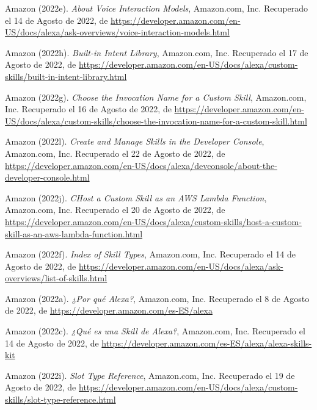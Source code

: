 
\begin{thebibliography}{9}
Amazon (2022e). \emph{About Voice Interaction Models}, Amazon.com, Inc. Recuperado el 14 de Agosto de 2022, de \url{https://developer.amazon.com/en-US/docs/alexa/ask-overviews/voice-interaction-models.html}

Amazon (2022h). \emph{Built-in Intent Library}, Amazon.com, Inc. Recuperado el 17 de Agosto de 2022, de \url{https://developer.amazon.com/en-US/docs/alexa/custom-skills/built-in-intent-library.html}

Amazon (2022g). \emph{Choose the Invocation Name for a Custom Skill}, Amazon.com, Inc. Recuperado el 16 de Agosto de 2022, de \url{https://developer.amazon.com/en-US/docs/alexa/custom-skills/choose-the-invocation-name-for-a-custom-skill.html}

Amazon (2022l). \emph{Create and Manage Skills in the Developer Console}, Amazon.com, Inc. Recuperado el 22 de Agosto de 2022, de \url{https://developer.amazon.com/en-US/docs/alexa/devconsole/about-the-developer-console.html}

Amazon (2022j). \emph{CHost a Custom Skill as an AWS Lambda Function}, Amazon.com, Inc. Recuperado el 20 de Agosto de 2022, de \url{https://developer.amazon.com/en-US/docs/alexa/custom-skills/host-a-custom-skill-as-an-aws-lambda-function.html}

Amazon (2022f). \emph{Index of Skill Types}, Amazon.com, Inc. Recuperado el 14 de Agosto de 2022, de \url{https://developer.amazon.com/en-US/docs/alexa/ask-overviews/list-of-skills.html}

Amazon (2022a). \emph{¿Por qué Alexa?}, Amazon.com, Inc. Recuperado el 8 de Agosto de 2022, de \url{https://developer.amazon.com/es-ES/alexa}

Amazon (2022c). \emph{¿Qué es una Skill de Alexa?}, Amazon.com, Inc. Recuperado el 14 de Agosto de 2022, de \url{https://developer.amazon.com/es-ES/alexa/alexa-skills-kit}

Amazon (2022i). \emph{Slot Type Reference}, Amazon.com, Inc. Recuperado el 19 de Agosto de 2022, de \url{https://developer.amazon.com/en-US/docs/alexa/custom-skills/slot-type-reference.html}


\end{thebibliography}
